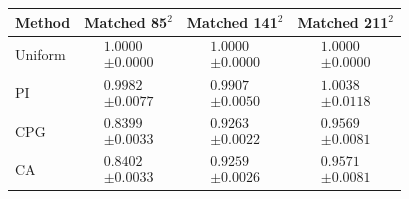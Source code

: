\begin{tabular}{lccc}
\toprule
Method & Matched 85$^2$ & Matched 141$^2$ & Matched 211$^2$ \\
\midrule
Uniform & $\begin{gathered}1.0000\\[-2pt]\pm 0.0000\end{gathered}$ & $\begin{gathered}1.0000\\[-2pt]\pm 0.0000\end{gathered}$ & $\begin{gathered}1.0000\\[-2pt]\pm 0.0000\end{gathered}$ \\
PI & $\begin{gathered}0.9982\\[-2pt]\pm 0.0077\end{gathered}$ & $\begin{gathered}0.9907\\[-2pt]\pm 0.0050\end{gathered}$ & $\begin{gathered}1.0038\\[-2pt]\pm 0.0118\end{gathered}$ \\
CPG & $\begin{gathered}0.8399\\[-2pt]\pm 0.0033\end{gathered}$ & $\begin{gathered}0.9263\\[-2pt]\pm 0.0022\end{gathered}$ & $\begin{gathered}0.9569\\[-2pt]\pm 0.0081\end{gathered}$ \\
CA & $\begin{gathered}0.8402\\[-2pt]\pm 0.0033\end{gathered}$ & $\begin{gathered}0.9259\\[-2pt]\pm 0.0026\end{gathered}$ & $\begin{gathered}0.9571\\[-2pt]\pm 0.0081\end{gathered}$ \\
\bottomrule
\end{tabular}
